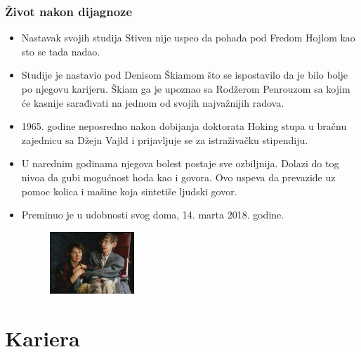 \documentclass{beamer}
\begin{document}
\begin{frame}[fragile]\frametitle{Život nakon dijagnoze}
	\begin{itemize} \fontsize{9}{6}\selectfont	
		\item  Nastavak svojih studija Stiven nije uspeo da pohađa pod Fredom Hojlom kao sto se tada nadao. 
		\item  Studije je nastavio pod Denisom Škiamom što se ispostavilo da je bilo bolje po njegovu karijeru. Škiam ga je upoznao sa Rodžerom Penrouzom sa kojim će kasnije sarađivati na jednom od svojih najvažnijih radova.
		\item  1965. godine neposredno nakon dobijanja doktorata Hoking stupa u bračnu zajednicu sa Džejn Vajld i prijavljuje se za istraživačku stipendiju.
		\item  U narednim godinama njegova bolest postaje sve ozbiljnija. Dolazi do tog nivoa da gubi mogućnost hoda kao i govora. Ovo uspeva da prevaziđe uz pomoc kolica i mašine koja sintetiše ljudski govor. 
		\item  Preminuo je u udobnosti svog doma, 14. marta 2018. godine. 
\begin{figure}[h!] 
\begin{center}
\includegraphics[width=0.3\textwidth]{StivenHoking.jpeg}
\end{center} 
 \captionsetup{font=small}{Slika2: Stiven Hoking i njegova žena} 
\label{fig:StivenHoking}
\end{figure}
\end{itemize}
\end{frame}


\section{Kariera}
\end{document}
